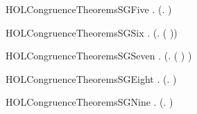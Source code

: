 \newcommand{\HOLCongruenceTheoremsSGFour}{\UseVerbatim{HOLCongruenceTheoremsSGFour}}
\begin{SaveVerbatim}{HOLCongruenceTheoremsSGFive}
\HOLTokenTurnstile{} \HOLSymConst{\HOLTokenForall{}} .   \HOLSymConst{\HOLTokenConj{}}   \HOLSymConst{\HOLTokenImp{}}  (\HOLTokenLambda{}.   \HOLSymConst{\ensuremath{\parallel}}  )
\end{SaveVerbatim}
\newcommand{\HOLCongruenceTheoremsSGFive}{\UseVerbatim{HOLCongruenceTheoremsSGFive}}
\begin{SaveVerbatim}{HOLCongruenceTheoremsSGSix}
\HOLTokenTurnstile{} \HOLSymConst{\HOLTokenForall{}} .   \HOLSymConst{\HOLTokenImp{}}  (\HOLTokenLambda{}. \HOLConst{\ensuremath{\nu}}  ( ))
\end{SaveVerbatim}
\newcommand{\HOLCongruenceTheoremsSGSix}{\UseVerbatim{HOLCongruenceTheoremsSGSix}}
\begin{SaveVerbatim}{HOLCongruenceTheoremsSGSeven}
\HOLTokenTurnstile{} \HOLSymConst{\HOLTokenForall{}} .   \HOLSymConst{\HOLTokenImp{}}  (\HOLTokenLambda{}.  ( ) )
\end{SaveVerbatim}
\newcommand{\HOLCongruenceTheoremsSGSeven}{\UseVerbatim{HOLCongruenceTheoremsSGSeven}}
\begin{SaveVerbatim}{HOLCongruenceTheoremsSGEight}
\HOLTokenTurnstile{} \HOLSymConst{\HOLTokenForall{}}.  (\HOLTokenLambda{}. \HOLConst{\ensuremath{\tau}} ) \HOLSymConst{\HOLTokenImp{}}  
\end{SaveVerbatim}
\newcommand{\HOLCongruenceTheoremsSGEight}{\UseVerbatim{HOLCongruenceTheoremsSGEight}}
\begin{SaveVerbatim}{HOLCongruenceTheoremsSGNine}
\HOLTokenTurnstile{} \HOLSymConst{\HOLTokenForall{}} .  (\HOLTokenLambda{}.   \HOLSymConst{+}  ) \HOLSymConst{\HOLTokenImp{}}   \HOLSymConst{\HOLTokenConj{}}  
\end{SaveVerbatim}
